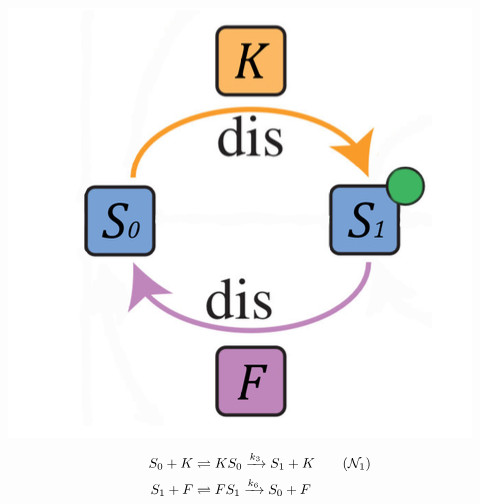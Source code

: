 \documentclass[aspectratio=169]{beamer}
\begin{document}
\begin{frame}
	\centering
	\includegraphics[width=0.5\linewidth]{pics/ex1-no-bifurcations.png} \\ 	

	\begin{align*}
		S_0 + K &\rightleftharpoons KS_0 \xrightarrow{k_3} S_1 + K  \tag{$\mathcal{N}_1$} \\
		S_1 + F &\rightleftharpoons FS_1 \xrightarrow{k_6} S_0 + F
	\end{align*}
\end{frame}
\end{document}

